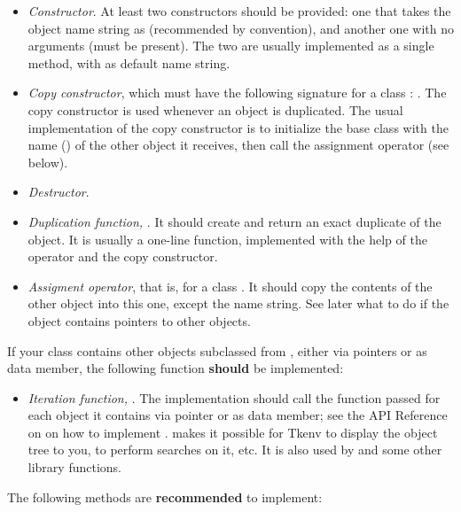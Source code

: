 \begin{itemize}
  \item{\textit{Constructor}. At least two constructors should be provided:
        one that takes the object name string as 
        (recommended by convention), and another one with no arguments
        (must be present). The two are usually implemented as a single
        method, with  as default name string.}
  \item{\textit{Copy constructor}, which must have the following signature
        for a class : . The copy constructor is used
        whenever an object is duplicated. The usual implementation of
        the copy constructor is to initialize the base class with the
        name () of the other object it receives, then call the
        assignment operator (see below).}
  \item{\textit{Destructor}.}
  \item{\textit{Duplication function,} .
        It should create and return an exact duplicate of the object.
        It is usually a one-line function, implemented with the help
        of the  operator and the copy constructor.}
  \item{\textit{Assigment operator}, that is, 
        for a class . It should copy the contents of the other
        object into this one, except the name string. See later what to do
        if the object contains pointers to other objects.}
\end{itemize}

If your class contains other objects subclassed from ,
either via pointers or as data member, the following function \textbf{should}
be implemented:

\begin{itemize}
  \item{\textit{Iteration function,} .
        The implementation should call the function passed
        for each object it contains via pointer or as data member;
        see the API Reference on  on how to implement
        .  makes it possible
        for Tkenv to display the object tree to you, to perform searches on it, etc.
        It is also used by  and some other library functions.}
\end{itemize}

The following methods are \textbf{recommended} to implement:


